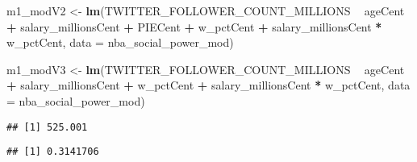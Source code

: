 \documentclass[]{article}
\newenvironment{Shaded}{\begin{snugshade}}{\end{snugshade}}
\newcommand{\DataTypeTok}[1]{\textcolor[rgb]{0.13,0.29,0.53}{#1}}
\newcommand{\KeywordTok}[1]{\textcolor[rgb]{0.13,0.29,0.53}{\textbf{#1}}}
\newcommand{\NormalTok}[1]{#1}
\newcommand{\OperatorTok}[1]{\textcolor[rgb]{0.81,0.36,0.00}{\textbf{#1}}}
\newcommand{\StringTok}[1]{\textcolor[rgb]{0.31,0.60,0.02}{#1}}
\begin{document}
\begin{Shaded}
\begin{Highlighting}[]
\NormalTok{m1_modV2 <-}\StringTok{ }\KeywordTok{lm}\NormalTok{(TWITTER_FOLLOWER_COUNT_MILLIONS }\OperatorTok{~}\StringTok{ }\NormalTok{ageCent }\OperatorTok{+}
\StringTok{               }\NormalTok{salary_millionsCent }\OperatorTok{+}
\StringTok{               }\NormalTok{PIECent }\OperatorTok{+}
\StringTok{               }\NormalTok{w_pctCent }\OperatorTok{+}
\StringTok{               }\NormalTok{salary_millionsCent }\OperatorTok{*}\StringTok{ }\NormalTok{w_pctCent,}
             \DataTypeTok{data =}\NormalTok{ nba_social_power_mod)}
\end{Highlighting}
\end{Shaded}

\begin{Shaded}
\begin{Highlighting}[]
\NormalTok{m1_modV3 <-}\StringTok{ }\KeywordTok{lm}\NormalTok{(TWITTER_FOLLOWER_COUNT_MILLIONS }\OperatorTok{~}\StringTok{ }\NormalTok{ageCent }\OperatorTok{+}
\StringTok{                 }\NormalTok{salary_millionsCent }\OperatorTok{+}
\StringTok{                 }\NormalTok{w_pctCent }\OperatorTok{+}
\StringTok{                 }\NormalTok{salary_millionsCent }\OperatorTok{*}\StringTok{ }\NormalTok{w_pctCent,}
               \DataTypeTok{data =}\NormalTok{ nba_social_power_mod)}
\end{Highlighting}
\end{Shaded}

\begin{Shaded}
\end{Shaded}

\begin{verbatim}
## [1] 525.001
\end{verbatim}

\begin{Shaded}
\end{Shaded}

\begin{verbatim}
## [1] 0.3141706
\end{verbatim}
\end{document}
